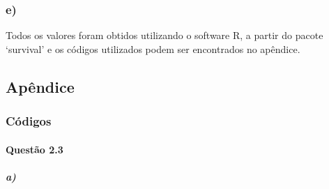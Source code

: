 \documentclass[
]{article}
\begin{document}
\hypertarget{e-1}{%
\subsubsection{e)}\label{e-1}}

Todos os valores foram obtidos utilizando o software R, a partir do
pacote `survival' e os códigos utilizados podem ser encontrados no
apêndice.

\pagebreak

\hypertarget{apuxeandice}{%
\subsection{Apêndice}\label{apuxeandice}}

\hypertarget{cuxf3digos}{%
\subsubsection{Códigos}\label{cuxf3digos}}

\hypertarget{questuxe3o-2.3-1}{%
\paragraph{Questão 2.3}\label{questuxe3o-2.3-1}}

\hypertarget{a-2}{%
\subparagraph{a)}\label{a-2}}

\hspace{2 pt}
\end{document}
